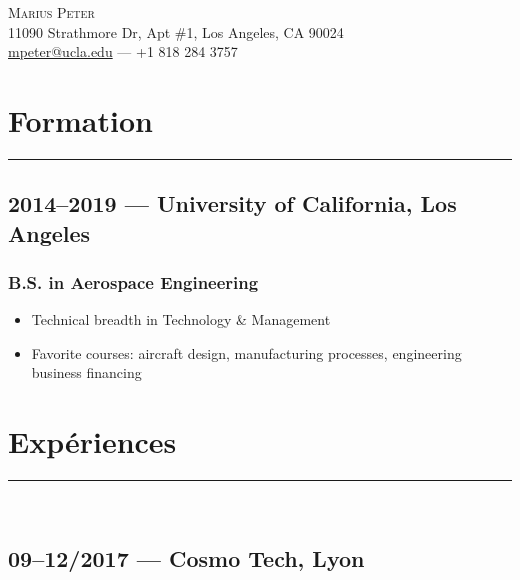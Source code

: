 \documentclass[10pt]{report}
\begin{document}
\centering
\huge \textsc{Marius Peter}\\[0.2cm]

\normalsize
11090 Strathmore Dr, Apt \#1,
Los Angeles, CA 90024\\
\href{mailto:mpeter@ucla.edu}{mpeter@ucla.edu} --- +1 818 284 3757\\[1cm]


\section*{Formation}
\rule{\linewidth}{1pt}
\subsection*{2014--2019 --- University of California, Los Angeles}
\subsubsection*{B.S. in Aerospace Engineering}
\begin{itemize}
    \item Technical breadth in Technology \& Management
    \item Favorite courses: aircraft design, manufacturing processes, engineering business financing
\end{itemize}

\section*{Expériences}
\rule{\linewidth}{1pt}\\
\subsection*{09--12/2017 --- Cosmo Tech, Lyon}
\end{document}

